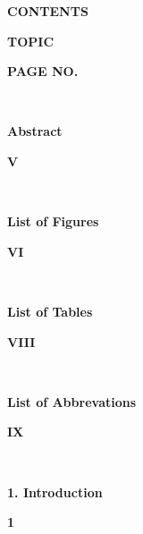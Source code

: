 \documentclass[12pt, English]{article}
\newcommand\tab[1][1cm]{\hspace*{#1}}
\begin{document}
\begin{titlepage}
\begin{center}
\textbf{\Large CONTENTS}
\end{center}
\vspace*{0.20in}
\noindent
{\begin{normalsize}
\textbf{\tab TOPIC}
\end{normalsize}
}
\hfill
{
\begin{normalsize}
\textbf{PAGE NO.}
\end{normalsize}
}\\

\noindent
{\begin{large}
\textbf{ \tab Abstract}
\end{large}
}
\hfill
{
\begin{normalsize}
\textbf{V}
\end{normalsize}
}\\
\noindent
{\begin{large}
\textbf{ \tab List of Figures}
\end{large}
}
\hfill
{
\begin{normalsize}
\textbf{VI}
\end{normalsize}
}\\
\noindent
{\begin{large}
\textbf{ \tab List of Tables}
\end{large}
}
\hfill
{
\begin{normalsize}
\textbf{VIII}
\end{normalsize}
}\\
\noindent
{\begin{large}
\textbf{ \tab List of Abbrevations}
\end{large}
}
\hfill
{
\begin{normalsize}
\textbf{IX}
\end{normalsize}
}\\
\noindent
{\begin{large}
\textbf{\tab 1. Introduction}
\end{large}
}
\hfill
{
\begin{large}
\textbf{1}
\end{large}
}


\end{titlepage}
\end{document}
